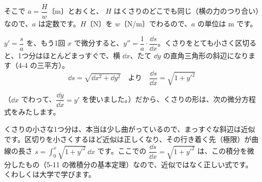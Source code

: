 \noindent そこで $a=\dfrac{H}{w}$〔m〕とおくと、
$H$ はくさりのどこでも同じ（横の力のつり合い）なので、$a$ は定数です。$H$〔N〕を $w$〔N/m〕でわるので、$a$ の単位は m です。

\noindent\begin{minipage}[c]{0.62\linewidth}
\raggedright
$y'=\dfrac{s}{a}$ を、もう1回 $x$ で微分すると、$y''=\dfrac{1}{a}\cdot\dfrac{\dd s}{\dd x}$。くさりをとても小さく区切ると、1つ分はほとんどまっすぐで、横 $\dd x$、たて $\dd y$ の直角三角形の斜辺になります（4-4 の三平方）。
\[ \dd s=\sqrt{\dd x^2+\dd y^2}\quad\text{より}\quad\frac{\dd s}{\dd x}=\sqrt{1+y'^2} \]
\end{minipage}\hfill
\begin{minipage}[c]{0.34\linewidth}
\centering
{}
\end{minipage}\par\vspace{2pt}
（$\dd x$ でわって、$\dfrac{\dd y}{\dd x}=y'$ を使いました。）だから、くさりの形は、次の微分方程式をみたします。
\begin{seikaku}
くさりの小さな1つ分は、本当は少し曲がっているので、まっすぐな斜辺は近似です。区切りを小さくするほど近似は正しくなり、その行き着く先（極限）が曲線の長さ $\displaystyle s=\int_0^x\sqrt{1+y'^2}\,\dd x$ です。ここでの $\dfrac{\dd s}{\dd x}=\sqrt{1+y'^2}$ は、この積分を微分したもの（5-11 の微積分の基本定理）なので、近似ではなく正しい式です。くわしくは大学で学びます。
\end{seikaku}

